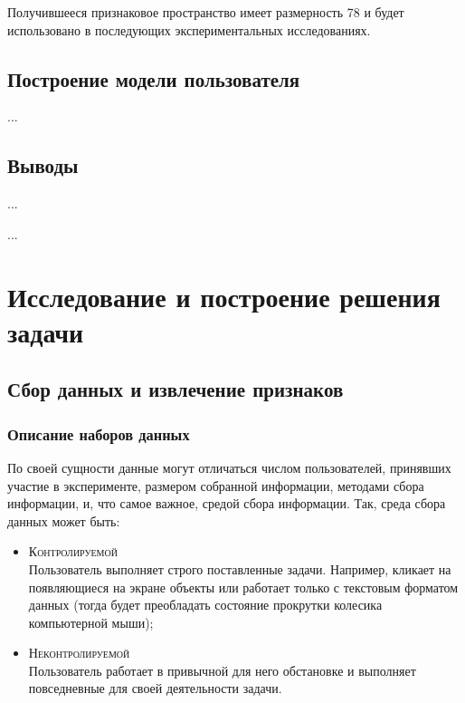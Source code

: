 \documentclass[12pt]{article}
\begin{document}
    \par Получившееся признаковое пространство имеет размерность 78 и будет использовано в последующих экспериментальных исследованиях.


    \subsection{Построение модели пользователя}
    \label{sec:Overview:Model}

    ...


    \subsection{Выводы}
    \label{sec:Overview:Conclusions}

    ...
    
    \newpage
    ...
    \newpage



    \section{Исследование и построение решения задачи}
    \label{sec:Research}
    
    \subsection{Сбор данных и извлечение признаков}
    \label{sec:Research:Data}

    \subsubsection{Описание наборов данных}
    \label{sec:Research:Data:Description}

    \par По своей сущности данные могут отличаться числом пользователей, принявших участие в эксперименте, размером собранной информации, методами сбора информации, и, что самое важное, средой сбора информации. Так, среда сбора данных может быть:

    \begin{itemize}
        \item \textsc{Контролируемой} \\
        Пользователь выполняет строго поставленные задачи. Например, кликает на появляющиеся на экране объекты или работает только с текстовым форматом данных (тогда будет преобладать состояние прокрутки колесика компьютерной мыши);
        \item \textsc{Неконтролируемой} \\
        Пользователь работает в привычной для него обстановке и выполняет повседневные для своей деятельности задачи.
    \end{itemize}
\end{document}
